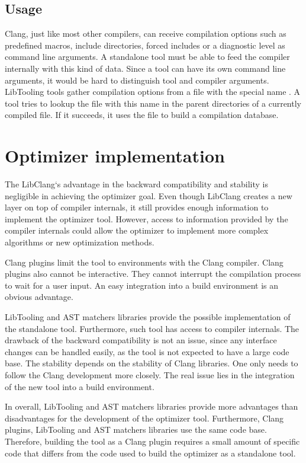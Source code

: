 \subsection{Usage}
Clang, just like most other compilers, can receive compilation options such as predefined macros, include directories, forced includes or a diagnostic level as command line arguments. A standalone tool must be able to feed the compiler internally with this kind of data. Since a tool can have its own command line arguments, it would be hard to distinguish tool and compiler arguments. LibTooling tools gather compilation options from a file with the special name . A tool tries to lookup the file with this name in the parent directories of a currently compiled file. If it succeeds, it uses the file to build a compilation database.

\section{Optimizer implementation}
\label{clang-optimizer}
The LibClang`s advantage in the backward compatibility and stability is negligible in achieving the optimizer goal. Even though LibClang creates a new layer on top of compiler internals, it still provides enough information to implement the optimizer tool. However, access to information provided by the compiler internals could allow the optimizer to implement more complex algorithms or new optimization methods.

Clang plugins limit the tool to environments with the Clang compiler. Clang plugins also cannot be interactive. They cannot interrupt the compilation process to wait for a user input. An easy integration into a build environment is an obvious advantage.

LibTooling and AST matchers libraries provide the possible implementation of the standalone tool. Furthermore, such tool has access to compiler internals. The drawback of the backward compatibility is not an issue, since any interface changes can be handled easily, as the tool is not expected to have a large code base. The stability depends on the stability of Clang libraries. One only needs to follow the Clang development more closely. The real issue lies in the integration of the new tool into a build environment.

In overall, LibTooling and AST matchers libraries provide more advantages than disadvantages for the development of the optimizer tool. Furthermore, Clang plugins, LibTooling and AST matchers libraries use the same code base. Therefore, building the tool as a Clang plugin requires a small amount of specific code that differs from the code used to build the optimizer as a standalone tool.